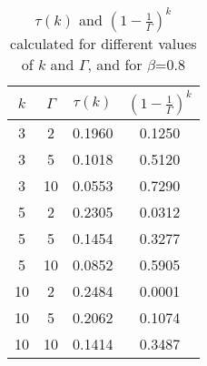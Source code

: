 \begin{table}[h!]
  \begin{center}
    \caption{$\tau (k)$ and $\left(1-\frac{1}{\Gamma}\right)^k$ calculated for different values of $k$ and $\Gamma$, and for $\beta$=0.8}
    \label{tab:table2}
    \begin{tabular}{c|c|c|c} %
      $k$ &$\Gamma$ & $\tau(k)$ & $\left(1-\frac{1}{\Gamma}\right)^k$\\
      \hline      
3 &2&    0.1960 &   0.1250\\
3 &5&    0.1018&    0.5120\\
3& 10&   0.0553&    0.7290\\
5 &2&    0.2305&    0.0312\\
5 &5&  0.1454&    0.3277\\
5& 10&    0.0852&    0.5905\\
10 &2&   0.2484&    0.0001\\
10& 5&   0.2062&    0.1074\\
10 &10&    0.1414&    0.3487\\
    \end{tabular}
  \end{center}
\end{table}





	
	

